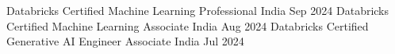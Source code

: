 


\begin{cvhonors}

  \cvhonor
    {Databricks Certified Machine Learning Professional} %
    {India} %
    {Sep 2024} %
  \cvhonor
    {Databricks Certified Machine Learning Associate} %
    {India} %
    {Aug 2024} %
  \cvhonor
    {Databricks Certified Generative AI Engineer Associate} %
    {India} %
    {Jul 2024} %
\end{cvhonors}